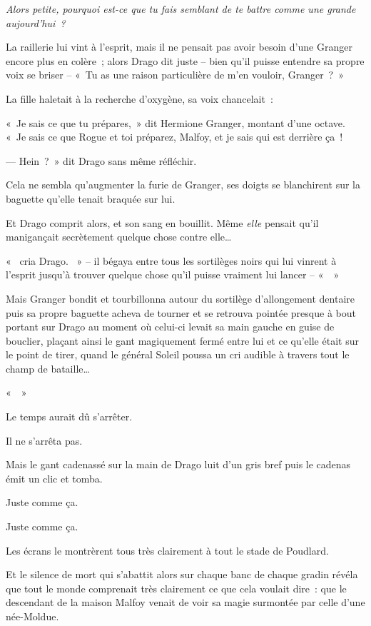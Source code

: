 \emph{Alors petite, pourquoi est-ce que tu fais semblant de te battre comme une grande aujourd'hui~?}

La raillerie lui vint à l'esprit, mais il ne pensait pas avoir besoin d'une Granger encore plus en colère~; alors Drago dit juste -- bien qu'il puisse entendre sa propre voix se briser -- «~Tu as une raison particulière de m'en vouloir, Granger~?~»

La fille haletait à la recherche d'oxygène, sa voix chancelait~:

«~Je sais ce que tu prépares,~» dit Hermione Granger, montant d'une octave. «~Je sais ce que Rogue et toi préparez, Malfoy, et je sais qui est derrière ça~!

--- Hein~?~» dit Drago sans même réfléchir.

Cela ne sembla qu'augmenter la furie de Granger, ses doigts se blanchirent sur la baguette qu'elle tenait braquée sur lui.

Et Drago comprit alors, et son sang en bouillit. Même \emph{elle} pensait qu'il manigançait secrètement quelque chose contre elle…

«~ cria Drago. ~» -- il bégaya entre tous les sortilèges noirs qui lui vinrent à l'esprit jusqu'à trouver quelque chose qu'il puisse vraiment lui lancer -- «~~»

Mais Granger bondit et tourbillonna autour du sortilège d'allongement dentaire puis sa propre baguette acheva de tourner et se retrouva pointée presque à bout portant sur Drago au moment où celui-ci levait sa main gauche en guise de bouclier, plaçant ainsi le gant magiquement fermé entre lui et ce qu'elle était sur le point de tirer, quand le général Soleil poussa un cri audible à travers tout le champ de bataille…

«~~»

Le temps aurait dû s'arrêter.

Il ne s'arrêta pas.

Mais le gant cadenassé sur la main de Drago luit d'un gris bref puis le cadenas émit un clic et tomba.

Juste comme ça.

Juste comme ça.

Les écrans le montrèrent tous très clairement à tout le stade de Poudlard.

Et le silence de mort qui s'abattit alors sur chaque banc de chaque gradin révéla que tout le monde comprenait très clairement ce que cela voulait dire~: que le descendant de la maison Malfoy venait de voir sa magie surmontée par celle d'une née-Moldue.

